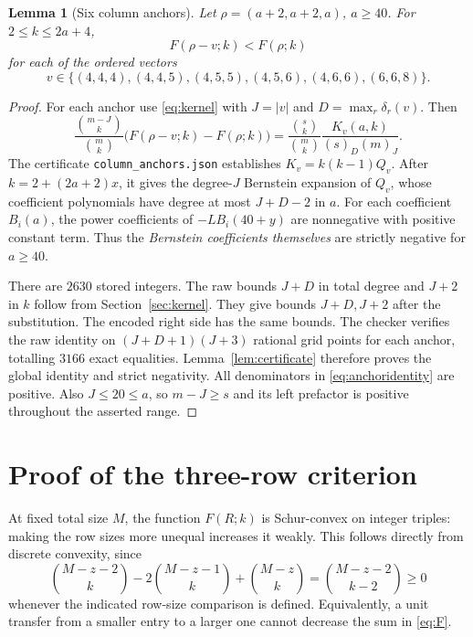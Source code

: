 \documentclass[11pt,a4paper]{article}
\newtheorem{lemma}[theorem]{Lemma}
\theoremstyle{remark}
\numberwithin{equation}{section}
\begin{document}
\begin{lemma}[Six column anchors]\label{lem:anchors}
Let \(\rho=(a+2,a+2,a)\), \(a\ge40\). For \(2\le k\le2a+4\),
\[
 F(\rho-v;k)<F(\rho;k)
\]
for each of the ordered vectors
\begin{equation}\label{eq:anchors}
 v\in\{(4,4,4),(4,4,5),(4,5,5),(4,5,6),(4,6,6),(6,6,8)\}.
\end{equation}
\end{lemma}
\begin{proof}
For each anchor use \eqref{eq:kernel} with \(J=|v|\) and
\(D=\max_r\delta_r(v)\). Then
\begin{equation}\label{eq:anchoridentity}
 \frac{\binom{m-J}k}{\binom mk}
       \bigl(F(\rho-v;k)-F(\rho;k)\bigr)
 =\frac{\binom sk}{\binom mk}\frac{K_v(a,k)}{(s)_D(m)_J}.
\end{equation}
The certificate \texttt{column\_anchors.json} establishes
\(K_v=k(k-1)Q_v\). After \(k=2+(2a+2)x\), it gives the degree-\(J\)
Bernstein expansion of \(Q_v\), whose coefficient polynomials have
degree at most \(J+D-2\) in \(a\).
For each coefficient \(B_i(a)\), the power coefficients of
\(-L B_i(40+y)\) are nonnegative with positive constant term.
Thus the \emph{Bernstein coefficients themselves} are strictly negative
for \(a\ge40\).

There are \(2630\) stored integers. The raw bounds \(J+D\) in
total degree and \(J+2\) in \(k\) follow from
Section~\ref{sec:kernel}. They give bounds \(J+D,J+2\) after
the substitution. The encoded right side has the same bounds.
The checker verifies the raw identity on
\((J+D+1)(J+3)\) rational grid points for each anchor,
totalling \(3166\) exact equalities. Lemma~\ref{lem:certificate}
therefore proves the global identity and strict negativity.
All denominators in \eqref{eq:anchoridentity} are positive.
Also \(J\le20\le a\), so \(m-J\ge s\) and its left prefactor
is positive throughout the asserted range.
\end{proof}

\section{Proof of the three-row criterion}\label{sec:criterionproof}
At fixed total size \(M\), the function \(F(R;k)\) is Schur-convex
on integer triples: making the row sizes more unequal increases it
weakly. This follows directly from discrete convexity, since
\begin{equation}\label{eq:convex}
 \binom{M-z-2}k-2\binom{M-z-1}k+\binom{M-z}k
       =\binom{M-z-2}{k-2}\ge0
\end{equation}
whenever the indicated row-size comparison is defined.
Equivalently, a unit transfer from a smaller entry to a larger one
cannot decrease the sum in \eqref{eq:F}.
\end{document}
